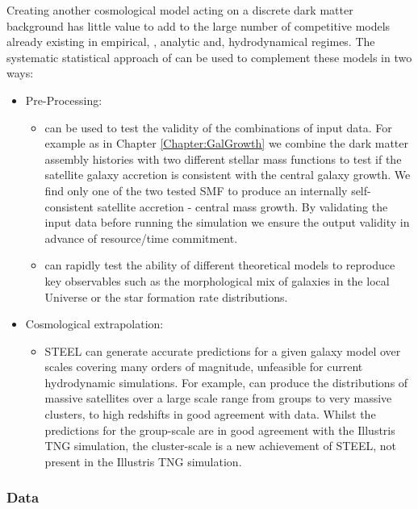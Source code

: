 Creating another cosmological model acting on a discrete dark matter background has little value to add to the large number of competitive models already existing in empirical, \cite[e.g.][]{Rodriguez-Puebla2017ConstrainingProperties, Moster2018Emerge10, Behroozi2019UniverseMachine:010, Zavala2012}, analytic \cite[e.g.][]{Somerville2015StarGas, Guo2011FromCosmology, Fontanot2007ReproducingCosmogony, Zoldan2019TheEvolution} and, hydrodynamical \cite{Springel2018FirstClustering, Hopkins2018FIRE-2Formation, McAlpine2015TheCatalogues} regimes. The systematic statistical approach of \steel can be used to complement these models in two ways:
\begin{itemize}
    \item Pre-Processing: 
    \begin{itemize}
        \item \steel can be used to test the validity of the combinations of input data. For example as in Chapter \ref{Chapter:GalGrowth} we combine the dark matter assembly histories with two different stellar mass functions to test if the satellite galaxy accretion is consistent with the central galaxy growth. We find only one of the two tested SMF to produce an internally self-consistent satellite accretion - central mass growth. By validating the input data before running the simulation we ensure the output validity in advance of resource/time commitment.
        \item \steel can rapidly test the ability of different theoretical models to reproduce key observables such as the morphological mix of galaxies in the local Universe or the star formation rate distributions. 
    \end{itemize}
    \item Cosmological extrapolation: 
    \begin{itemize}
        \item STEEL can generate accurate predictions for a given galaxy model over scales covering many orders of magnitude, unfeasible for current hydrodynamic simulations. For example, \steel can produce the distributions of massive satellites over a large scale range from groups to very massive clusters, to high redshifts in good agreement with data. Whilst the predictions for the group-scale are in good agreement with the Illustris TNG simulation, the cluster-scale is a new achievement of STEEL, not present in the Illustris TNG simulation.
    \end{itemize}
\end{itemize}
\subsubsection{Data}

